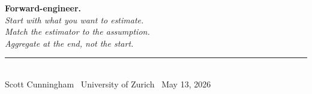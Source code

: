 \documentclass[aspectratio=169,11pt]{beamer}
\begin{document}
\begin{frame}[plain]
\centering
\vspace{2.5em}
{\Huge\bfseries\color{forest} Forward-engineer.}\\[1.5em]
{\Large\itshape\color{charcoal} Start with what you want to estimate.\\Match the estimator to the assumption.\\Aggregate at the end, not the start.}\\[2em]
\rule{0.4\textwidth}{0.6pt}\\[0.8em]
{\small\color{warmgray} Scott Cunningham \textperiodcentered\ University of Zurich \textperiodcentered\ May 13, 2026}
\end{frame}
\end{document}
